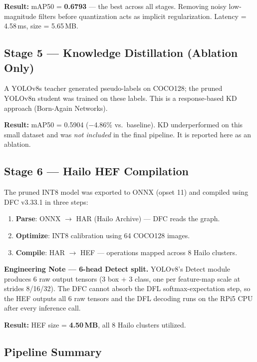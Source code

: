 \documentclass[journal, onecolumn]{IEEEtran}
\begin{document}
\noindent\textbf{Result:} mAP50 = \textbf{0.6793} — the best across all stages. Removing noisy low-magnitude filters before quantization acts as implicit regularization. Latency = 4.58\,ms, size = 5.65\,MB.

\subsection{Stage 5 — Knowledge Distillation (Ablation Only)}

A YOLOv8s teacher generated pseudo-labels on COCO128; the pruned YOLOv8n student was trained on these labels. This is a response-based KD approach (Born-Again Networks).

\noindent\textbf{Result:} mAP50 = 0.5904 ($-$4.86\% vs.\ baseline). KD underperformed on this small dataset and was \emph{not included} in the final pipeline. It is reported here as an ablation.

\subsection{Stage 6 — Hailo HEF Compilation}

The pruned INT8 model was exported to ONNX (opset 11) and compiled using DFC v3.33.1 in three steps:
\begin{enumerate}
  \item \textbf{Parse}: ONNX $\to$ HAR (Hailo Archive) — DFC reads the graph.
  \item \textbf{Optimize}: INT8 calibration using 64 COCO128 images.
  \item \textbf{Compile}: HAR $\to$ HEF — operations mapped across 8 Hailo clusters.
\end{enumerate}

\begin{infobox}
\textbf{Engineering Note — 6-head Detect split.}
YOLOv8's Detect module produces 6 raw output tensors (3 box + 3 class, one per feature-map scale at strides 8/16/32). The DFC cannot absorb the DFL softmax-expectation step, so the HEF outputs all 6 raw tensors and the DFL decoding runs on the RPi5 CPU after every inference call.
\end{infobox}

\noindent\textbf{Result:} HEF size = \textbf{4.50\,MB}, all 8 Hailo clusters utilized.

\subsection{Pipeline Summary}
\end{document}
